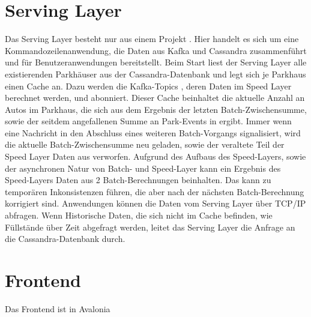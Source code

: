 \section{Serving Layer}
Das Serving Layer besteht nur aus einem Projekt .
Hier handelt es sich um eine Kommandozeilenanwendung, die Daten aus Kafka und Cassandra zusammenführt und für Benutzeranwendungen bereitstellt.
Beim Start liest der Serving Layer alle existierenden Parkhäuser aus der Cassandra-Datenbank und legt sich je Parkhaus einen Cache an.
Dazu werden die Kafka-Topics , deren Daten im Speed Layer berechnet werden, und  abonniert.
Dieser Cache beinhaltet die aktuelle Anzahl an Autos im Parkhaus, die sich aus dem Ergebnis der letzten Batch-Zwischensumme, sowie der seitdem angefallenen Summe an Park-Events in  ergibt.
Immer wenn eine Nachricht in  den Abschluss eines weiteren Batch-Vorgangs signalisiert, wird die aktuelle Batch-Zwischensumme neu geladen, sowie der veraltete Teil der Speed Layer Daten aus  verworfen.
Aufgrund des Aufbaus des Speed-Layers, sowie der asynchronen Natur von Batch- und Speed-Layer kann ein Ergebnis des Speed-Layers Daten aus 2 Batch-Berechnungen beinhalten.
Das kann zu temporären Inkonsistenzen führen, die aber nach der nächsten Batch-Berechnung korrigiert sind.
Anwendungen können die Daten vom Serving Layer über TCP/IP abfragen.
Wenn Historische Daten, die sich nicht im Cache befinden, wie Füllstände über Zeit abgefragt werden, leitet das Serving Layer die Anfrage an die Cassandra-Datenbank durch.

\section{Frontend}
Das Frontend ist in Avalonia 
